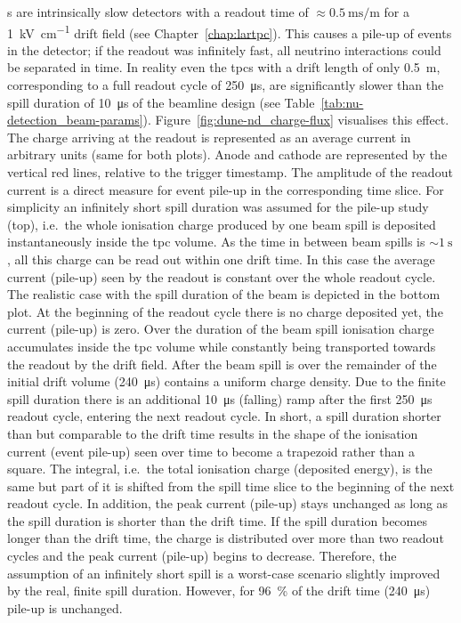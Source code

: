 \lartpc{}s are intrinsically slow detectors with a readout time of $\approx \SI{0.5}{\milli\second\per\metre}$ for a \SI{1}{\kilo\volt\per\centi\metre} drift field (see Chapter~\ref{chap:lartpc}).
This causes a pile-up of events in the detector; if the readout was infinitely fast, all neutrino interactions could be separated in time.
In reality even the \AC{} \glspl{tpc} with a drift length of only \SI{0.5}{\metre}, corresponding to a full readout cycle of \SI{250}{\micro\second}, are significantly slower than the spill duration of \SI{10}{\micro\second} of the \dune{} beamline design (see Table~\ref{tab:nu-detection_beam-params}).
Figure~\ref{fig:dune-nd_charge-flux} visualises this effect.
The charge arriving at the readout is represented as an average current in arbitrary units (same for both plots).
Anode and cathode are represented by the vertical red lines, relative to the trigger timestamp.
The amplitude of the readout current is a direct measure for event pile-up in the corresponding time slice.
For simplicity an infinitely short spill duration was assumed for the pile-up study (top), i.e.\ the whole ionisation charge produced by one beam spill is deposited instantaneously inside the \gls{tpc} volume.
As the time in between beam spills is $\sim{\SI{1}{\second}}$, all this charge can be read out within one drift time.
In this case the average current (pile-up) seen by the readout is constant over the whole readout cycle.
The realistic case with the spill duration of the \dune{} beam is depicted in the bottom plot.
At the beginning of the readout cycle there is no charge deposited yet, the current (pile-up) is zero.
Over the duration of the beam spill ionisation charge accumulates inside the \gls{tpc} volume while constantly being transported towards the readout by the drift field.
After the beam spill is over the remainder of the initial drift volume (\SI{240}{\micro\second}) contains a uniform charge density.
Due to the finite spill duration there is an additional \SI{10}{\micro\second} (falling) ramp after the first \SI{250}{\micro\second} readout cycle, entering the next readout cycle.
In short, a spill duration shorter than but comparable to the drift time results in the shape of the ionisation current (event pile-up) seen over time to become a trapezoid rather than a square.
The integral, i.e.\ the total ionisation charge (deposited energy), is the same but part of it is shifted from the spill time slice to the beginning of the next readout cycle.
In addition, the peak current (pile-up) stays unchanged as long as the spill duration is shorter than the drift time.
If the spill duration becomes longer than the drift time, the charge is distributed over more than two readout cycles and the peak current (pile-up) begins to decrease.
Therefore, the assumption of an infinitely short spill is a worst-case scenario slightly improved by the real, finite spill duration.
However, for \SI{96}{\percent} of the drift time (\SI{240}{\micro\second}) pile-up is unchanged.


